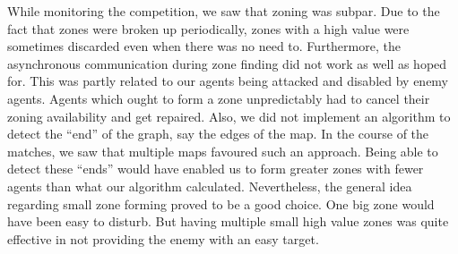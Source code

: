 While monitoring the competition, we saw that zoning was subpar.
Due to the fact that zones were broken up periodically, zones with a high value were sometimes discarded even when there was no need to.
Furthermore, the asynchronous communication during zone finding did not work as well as hoped for.
This was partly related to our agents being attacked and disabled by enemy agents.
Agents which ought to form a zone unpredictably had to cancel their zoning availability and get repaired.
Also, we did not implement an algorithm to detect the ``end'' of the graph, say the edges of the map.
In the course of the matches, we saw that multiple maps favoured such an approach.
Being able to detect these ``ends'' would have enabled us to form greater zones with fewer agents than what our algorithm calculated.
Nevertheless, the general idea regarding small zone forming proved to be a good choice.
One big zone would have been easy to disturb.
But having multiple small high value zones was quite effective in not providing the enemy with an easy target.
